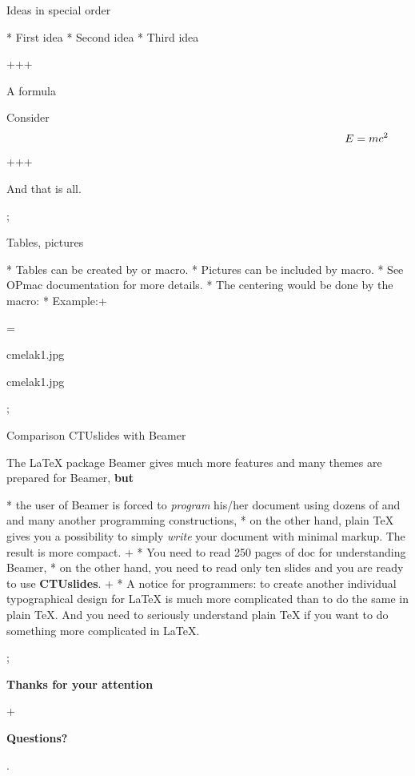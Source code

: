 \secc \s Ideas in special order

* { First idea}
* { Second idea}
* { Third idea}

\pg+\pg+\pg+

\secc\s A formula

Consider
$$
  \s E = {\pshow5 m}{\pshow6 c^2} 
$$

\pg+\pg+\pg+

And that is all.

\pg; %

\restore

\sec Tables, pictures

* Tables can be created by \code{\\table} or \code{\\ctable} macro.
* Pictures can be included by \code{\\inspic} macro.
* See OPmac documentation for more details.
* The centering would be done by the \code{\\centerline{}} macro:
* Example:\pg+

\pg=\begtt
\centerline{\picw=5cm \inspic cmelak1.jpg }
\endtt

\medskip
\centerline{\picw=5cm \inspic cmelak1.jpg } 

\pg; %

\sec Comparison CTUslides with Beamer

The \LaTeX{} package Beamer gives much more features and many themes
are prepared for Beamer, {\bf\Red but}

* the user of Beamer is forced to {\em program} his/her document using 
  dozens of \code{\\begin{foo}} and \code{\\end{foo}} and many another
  programming constructions,
* on the other hand, plain \TeX{} gives you a possibility to simply 
  {\em write} your document with minimal markup. The result is more compact.
\pg+
* You need to read 250 pages of doc for understanding Beamer,
* on the other hand, you need to read only ten 
  slides
  and you are ready to use {\bf\Blue CTUslides}.
\pg+
* A notice for programmers: to create another individual typographical 
  design for \LaTeX{} is much more complicated than to do the same
  in plain \TeX. And you need to seriously understand plain \TeX{} if you
  want to do something more complicated in \LaTeX.

\pg; %

\null
\vskip2cm
\centerline{\typosize[35/40]\bf Thanks for your attention}\pg+

\vskip2cm
\centerline{\Blue\typosize[60/70]\bf Questions?}

\pg. %

